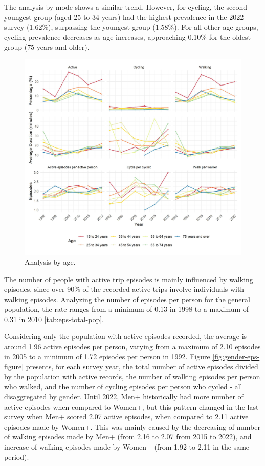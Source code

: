 \documentclass[preprint, 3p,
authoryear]{elsarticle} %
\begin{document}
The analysis by mode shows a similar trend. However, for cycling, the
second youngest group (aged 25 to 34 years) had the highest prevalence
in the 2022 survey (1.62\%), surpassing the youngest group (1.58\%). For
all other age groups, cycling prevalence decreases as age increases,
approaching 0.10\% for the oldest group (75 years and older).

\begin{figure}
\includegraphics[width=1\linewidth]{figures/combined_plot_age} \caption{Analysis by age.}\label{fig:age-combined-figure}
\end{figure}

The number of people with active trip episodes is mainly influenced by
walking episodes, since over 90\% of the recorded active trips involve
individuals with walking episodes. Analyzing the number of episodes per
person for the general population, the rate ranges from a minimum of
0.13 in 1998 to a maximum of 0.31 in 2010 \ref{tab:eps-total-pop}.

Considering only the population with active episodes recorded, the
average is around 1.96 active episodes per person, varying from a
maximum of 2.10 episodes in 2005 to a minimum of 1.72 episodes per
person in 1992. Figure \ref{fig:gender-eps-figure} presents, for each
survey year, the total number of active episodes divided by the
population with active records, the number of walking episodes per
person who walked, and the number of cycling episodes per person who
cycled - all disaggregated by gender. Until 2022, Men+ historically had
more number of active episodes when compared to Women+, but this pattern
changed in the last survey when Men+ scored 2.07 active episodes, when
compared to 2.11 active episodes made by Women+. This was mainly caused
by the decreasing of number of walking episodes made by Men+ (from 2.16
to 2.07 from 2015 to 2022), and increase of walking episodes made by
Women+ (from 1.92 to 2.11 in the same period).
\end{document}
